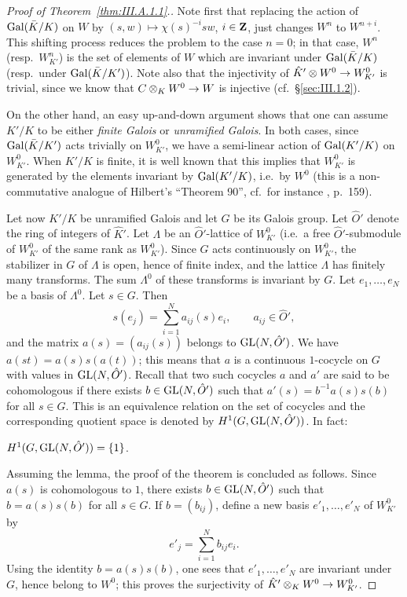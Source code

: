 \begin{proof}[Proof of Theorem~\ref{thm:III.A.1.1}.]
Note first that replacing the action of $\mathrm{Gal}(\bar K/K)$ on $W$ by
$(s,w)\mapsto \chi(s)^{-i}sw$, $i\in\mathbf{Z}$, just changes $W^n$ to
$W^{n+i}$.  This shifting process reduces the problem to the case
$n=0$; in that case, $W^n$ (resp.\ $W^n_{K'}$) is the set of elements of
$W$ which are invariant under $\mathrm{Gal}(\bar K/K)$ (resp.\ under
$\mathrm{Gal}(\bar K/K')$).  Note also that the injectivity of
$\hat K'\mathbin{\otimes} W^0 \to W^0_{K'}$ is trivial, since we know that
$C\mathbin{\otimes}_K W^0 \to W$ is injective (cf.~\S\ref{sec:III.1.2}).

On the other hand, an easy up-and-down argument shows that one can
assume $K'/K$ to be either \emph{finite Galois} or \emph{unramified
Galois}.  In both cases, since $\mathrm{Gal}(\bar K/K')$ acts trivially on
$W^0_{K'}$, we have a semi-linear action of $\mathrm{Gal}(K'/K)$ on
$W^0_{K'}$.  When $K'/K$ is finite, it is well known that this implies
that $W^0_{K'}$ is generated by the elements invariant by
$\mathrm{Gal}(K'/K)$, i.e.\ by $W^0$ (this is a non-commutative analogue of
Hilbert's ``Theorem 90'', cf.\ for instance \cite{serre-corps},
p.~159).

Let now $K'/K$ be unramified Galois and let $G$ be its Galois group.
Let $\hat O'$ denote the ring of integers of $\hat K'$.  Let $\Lambda$
be an $\hat O'$-lattice of $W^0_{K'}$ (i.e.\ a free $\hat O'$-submodule
of $W^0_{K'}$ of the same rank as $W^0_{K'}$).  Since $G$ acts
continuously on $W^0_{K'}$, the stabilizer in $G$ of $\Lambda$ is open,
hence of finite index, and the lattice $\Lambda$ has finitely many
transforms.  The sum $\Lambda^0$ of these transforms is invariant by
$G$.  Let $e_1,\ldots,e_N$ be a basis of $\Lambda^0$.  Let $s\in G$.
Then
\[
s(e_j)=\sum_{i=1}^{N} a_{ij}(s)e_i,\qquad a_{ij}\in\hat O',
\]
and the matrix $a(s)=(a_{ij}(s))$ belongs to $\mathrm{GL}(N,\hat O')$.  We have
$a(st)=a(s)s(a(t))$; this means that $a$ is a continuous $1$-cocycle on
$G$ with values in $\mathrm{GL}(N,\hat O')$.  Recall that two such cocycles
$a$ and $a'$ are said to be cohomologous if there exists
$b\in\mathrm{GL}(N,\hat O')$ such that $a'(s)=b^{-1}a(s)s(b)$ for all $s\in G$.
This is an equivalence relation on the set of cocycles and the
corresponding quotient space is denoted by $H^1(G,\mathrm{GL}(N,\hat O'))$.
In fact:

\begin{lemma}
$H^1(G,\mathrm{GL}(N,\hat O'))=\{1\}$.
\end{lemma}

Assuming the lemma, the proof of the theorem is concluded as follows.
Since $a(s)$ is cohomologous to $1$, there exists $b\in\mathrm{GL}(N,\hat O')$
such that $b=a(s)s(b)$ for all $s\in G$.  If $b=(b_{ij})$, define a new
basis $e'_1,\ldots,e'_N$ of $W^0_{K'}$ by
\[
e'_j=\sum_{i=1}^{N} b_{ij}e_i.
\]
Using the identity $b=a(s)s(b)$, one sees that $e'_1,\ldots,e'_N$ are
invariant under $G$, hence belong to $W^0$; this proves the
surjectivity of $\hat K'\mathbin{\otimes}_K W^0 \to W^0_{K'}$.
\end{proof}

